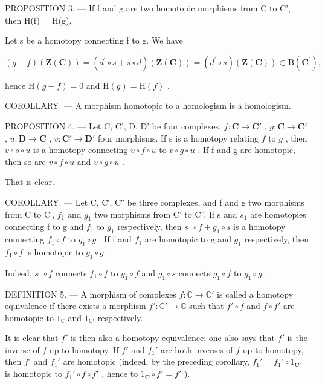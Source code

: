 PROPOSITION 3. --- If f and g are two homotopic morphisms from C to C', then H(f) = H(g).

Let s be a homotopy connecting f to g. We have

\[
(g - f) (\mathbf {Z} (\mathbf {C})) = (d ^ {\prime} \circ s + s \circ d) (\mathbf {Z} (\mathbf {C})) = (d ^ {\prime} \circ s) (\mathbf {Z} (\mathbf {C})) \subset \mathrm{B} (\mathbf {C} ^ {\prime}),
\]

hence \(\mathrm{H}(g - f) = 0\) and \(\mathrm{H}(g) = \mathrm{H}(f)\) .

COROLLARY. --- A morphism homotopic to a homologism is a homologism.

PROPOSITION 4. --- Let C, C', D, D' be four complexes, \(f: \mathbf{C} \to \mathbf{C}'\) , \(g: \mathbf{C} \to \mathbf{C}'\) , \(u: \mathbf{D} \to \mathbf{C}\) , \(v: \mathbf{C}' \to \mathbf{D}'\) four morphisms. If s is a homotopy relating \(f\) to \(g\) , then \(v \circ s \circ u\) is a homotopy connecting \(v \circ f \circ u\) to \(v \circ g \circ u\) . If f and g are homotopic, then so are \(v \circ f \circ u\) and \(v \circ g \circ u\) .

That is clear.

COROLLARY. --- Let C, C′, C″ be three complexes, and f and g two morphisms from C to C′, \(f_{1}\) and \(g_{1}\) two morphisms from C' to C''. If s and \(s_{1}\) are homotopies connecting f to g and \(f_{1}\) to \(g_{1}\) respectively, then \(s_{1} \circ f + g_{1} \circ s\) is a homotopy connecting \(f_{1} \circ f\) to \(g_{1} \circ g\) . If f and \(f_{1}\) are homotopic to g and \(g_{1}\) respectively, then \(f_{1} \circ f\) is homotopic to \(g_{1} \circ g\) .

Indeed, \(s_{1} \circ f\) connects \(f_{1} \circ f\) to \(g_{1} \circ f\) and \(g_{1} \circ s\) connects \(g_{1} \circ f\) to \(g_{1} \circ g\) .

DEFINITION 5. --- A morphism of complexes \(f: \mathbb{C} \to \mathbb{C}'\) is called a homotopy equivalence if there exists a morphism \(f': \mathbb{C}' \to \mathbb{C}\) such that \(f' \circ f\) and \(f \circ f'\) are homotopic to \(1_{\mathbb{C}}\) and \(1_{\mathbb{C}'}\) respectively.

It is clear that \(f'\) is then also a homotopy equivalence; one also says that \(f'\) is the inverse of \(f\) up to homotopy. If \(f'\) and \(f_1'\) are both inverses of \(f\) up to homotopy, then \(f'\) and \(f_1'\) are homotopic (indeed, by the preceding corollary, \(f_1' = f_1' \circ 1_{\mathbf{C}'}\) is homotopic to \(f_1' \circ f \circ f'\) , hence to \(1_{\mathbf{C}} \circ f' = f'\) ).

